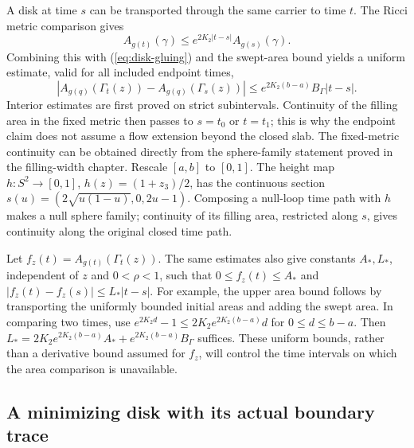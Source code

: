 \begin{lemma}\label{lem:annular-time-control}
A disk at time $s$ can be transported through the same carrier to time $t$.
The Ricci metric comparison gives
\begin{equation}
 A_{g(t)}(\gamma)\le e^{2K_2|t-s|}A_{g(s)}(\gamma).
 \label{eq:metric-area-transport}
\end{equation}
Combining this with (\ref{eq:disk-gluing}) and the swept-area bound yields a
uniform estimate, valid for all included endpoint times,
\begin{equation}
 \left|A_{g(q)}(\Gamma_t(z))-A_{g(q)}(\Gamma_s(z))\right|
 \le e^{2K_2(b-a)}B_{\Gamma}|t-s|.
 \label{eq:time-area-lipschitz}
\end{equation}
Interior estimates are first proved on strict subintervals.  Continuity of
the filling area in the fixed metric then passes to $s=t_0$ or $t=t_1$;
this is why the endpoint claim does not assume a flow extension beyond the
closed slab.
The fixed-metric continuity can be obtained directly from the
sphere-family statement proved in the filling-width chapter.
Rescale $[a,b]$ to $[0,1]$.  The height map
$h:S^2\to[0,1]$, $h(z)=(1+z_3)/2$, has the continuous section
$s(u)=(2\sqrt{u(1-u)},0,2u-1)$.
Composing a null-loop time path with $h$ makes a null sphere
family; continuity of its filling area, restricted along $s$,
gives continuity along the original closed time path.
\end{lemma}

Let $f_z(t)=A_{g(t)}(\Gamma_t(z))$.  The same estimates also give constants
$A_*,L_*$, independent of $z$ and $0<\rho<1$, such that
$0\le f_z(t)\le A_*$ and $|f_z(t)-f_z(s)|\le L_*|t-s|$.
For example, the upper area bound follows by transporting the uniformly
bounded initial areas and adding the swept area.  In comparing two times,
use $e^{2K_2d}-1\le2K_2e^{2K_2(b-a)}d$ for $0\le d\le b-a$.
Then $L_*=2K_2e^{2K_2(b-a)}A_*+e^{2K_2(b-a)}B_{\Gamma}$ suffices.
These uniform bounds, rather than a derivative bound assumed for $f_z$,
will control the time intervals on which the area comparison is unavailable.

\subsection{A minimizing disk with its actual boundary trace}
\label{sec:annular-plateau}

